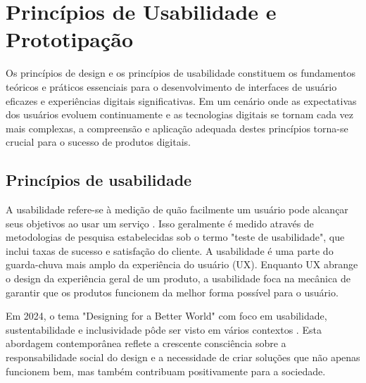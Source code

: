 \chapter{Princípios de Usabilidade e Prototipação}

Os princípios de design e os princípios de usabilidade constituem os fundamentos teóricos e práticos essenciais para o desenvolvimento de interfaces de usuário eficazes e experiências digitais significativas. Em um cenário onde as expectativas dos usuários evoluem continuamente e as tecnologias digitais se tornam cada vez mais complexas, a compreensão e aplicação adequada destes princípios torna-se crucial para o sucesso de produtos digitais.


\section{Princípios de usabilidade}

A usabilidade refere-se à medição de quão facilmente um usuário pode alcançar seus objetivos ao usar um serviço \cite{digital_gov_usability}. Isso geralmente é medido através de metodologias de pesquisa estabelecidas sob o termo "teste de usabilidade", que inclui taxas de sucesso e satisfação do cliente. A usabilidade é uma parte do guarda-chuva mais amplo da experiência do usuário (UX). Enquanto UX abrange o design da experiência geral de um produto, a usabilidade foca na mecânica de garantir que os produtos funcionem da melhor forma possível para o usuário.

Em 2024, o tema "Designing for a Better World" com foco em usabilidade, sustentabilidade e inclusividade pôde ser visto em vários contextos \cite{world_usability_day}. Esta abordagem contemporânea reflete a crescente consciência sobre a responsabilidade social do design e a necessidade de criar soluções que não apenas funcionem bem, mas também contribuam positivamente para a sociedade.

